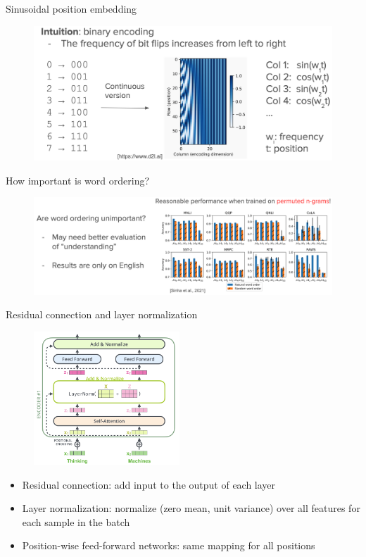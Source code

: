 \documentclass[usenames,dvipsnames,11pt,aspectratio=169]{beamer}
\begin{document}
\begin{frame}
    {Sinusoidal position embedding}
    \begin{figure}
        \includegraphics[width=\textwidth]{figures/sinusoidal}
    \end{figure}
\end{frame}

\begin{frame}
    {How important is word ordering?}
    \begin{figure}
        \includegraphics[width=\textwidth]{figures/permute}
    \end{figure}
\end{frame}

\begin{frame}
    {Residual connection and layer normalization}
    \begin{figure}
        \includegraphics[height=5cm]{figures/add-norm}
    \end{figure}
    \vspace{-2em}
    \begin{itemize}
        \item Residual connection: add input to the output of each layer 
        \item Layer normalization: normalize (zero mean, unit variance) over all features for each sample in the batch
        \item Position-wise feed-forward networks: same mapping for all positions
    \end{itemize}
\end{frame}
\end{document}
